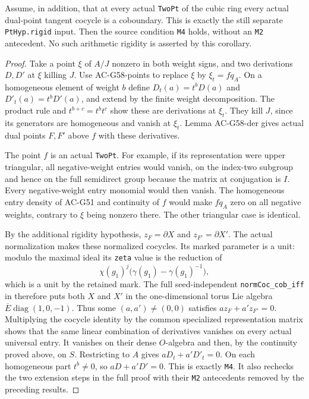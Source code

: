 \begin{corollary}
\label{AC-G58-M4}
Assume, in addition, that at every actual
\texttt{TwoPt} of the cubic ring every actual
dual-point tangent cocycle is a coboundary.
This is exactly the still separate
\texttt{PtHyp.rigid} input.
Then the source condition \texttt{M4} holds,
without an \texttt{M2} antecedent.
No such arithmetic rigidity is asserted by
this corollary.
\end{corollary}
\begin{proof}
Take a point $\xi$ of $A/J$ nonzero in both
weight signs, and two derivations $D,D'$ at
$\xi$ killing $J$.
Use AC-G58-points to replace $\xi$ by
$\xi_t=fq_A$.  On a homogeneous element of
weight $b$ define
$D_t(a)=t^bD(a)$ and $D'_t(a)=t^bD'(a)$,
and extend by the finite weight decomposition.
The product rule and $t^{b+c}=t^bt^c$
show these are derivations at $\xi_t$.
They kill $J$, since its generators are
homogeneous and vanish at $\xi_t$.
Lemma AC-G58-der gives actual dual points
$F,F'$ above $f$ with these derivatives.

The point $f$ is an actual \texttt{TwoPt}.
For example, if its representation were upper
triangular, all negative-weight entries would
vanish, on the index-two subgroup and hence
on the full semidirect group because the
matrix at conjugation is $I$.
Every negative-weight entry monomial would
then vanish.  The homogeneous entry density
of AC-G51 and continuity of $f$ would make
$fq_A$ zero on all negative weights,
contrary to $\xi$ being nonzero there.
The other triangular case is identical.

By the additional rigidity hypothesis,
$z_F=\partial X$ and $z_{F'}=\partial X'$.
The actual normalization makes these
normalized cocycles.
Its marked parameter is a unit: modulo
the maximal ideal its \texttt{zeta} value is
the reduction of
\[
          \chi(g_1)^j
                    \bigl(\gamma(g_1)-\gamma(g_1)^{-1}\bigr),
                                                               \tag{G58.13}
\]
which is a unit by the retained mark.
The full seed-independent
\texttt{normCoc\_cob\_iff} in
therefore puts both $X$ and $X'$ in the
one-dimensional torus Lie algebra
$\overline E\operatorname{diag}(1,0,-1)$.
Thus some $(a,a')\ne(0,0)$ satisfies
$a z_F+a'z_{F'}=0$.
Multiplying the cocycle identity by the
common specialized representation matrix
shows that the same linear combination
of derivatives vanishes on every actual
universal entry.
It vanishes on their dense $O$-algebra and
then, by the continuity proved above, on
$S$.
Restricting to $A$ gives
$aD_t+a'D'_t=0$.
On each homogeneous part $t^b\ne0$, so
$aD+a'D'=0$.
This is exactly \texttt{M4}.
It also rechecks the two extension steps in
the full proof
with their \texttt{M2} antecedents removed
by the preceding results.
\end{proof}

